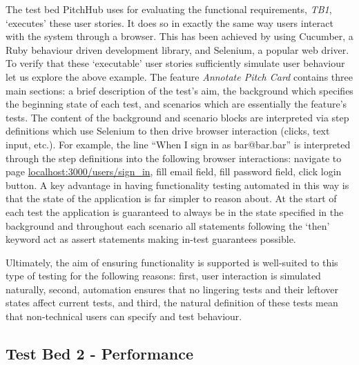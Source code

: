 The test bed PitchHub uses for evaluating the functional requirements, \textit{TB1}, `executes' these user stories. It does so in exactly the same way users interact with the system through a browser. This has been achieved by using Cucumber, a Ruby behaviour driven development library, and Selenium, a popular web driver. To verify that these `executable' user stories sufficiently simulate user behaviour let us explore the above example. The feature \textit{Annotate Pitch Card} contains three main sections: a brief description of the test's aim, the background which specifies the beginning state of each test, and scenarios which are essentially the feature's tests. The content of the background and scenario blocks are interpreted via step definitions which use Selenium to then drive browser interaction (clicks, text input, etc.). For example, the line ``When I sign in as bar@bar.bar'' is interpreted through the step definitions into the following browser interactions: navigate to page \url{localhost:3000/users/sign_in}, fill email field, fill password field, click login button.
A key advantage in having functionality testing automated in this way is that the state of the application is far simpler to reason about. At the start of each test the application is guaranteed to always be in the state specified in the background and throughout each scenario all statements following the `then' keyword act as assert statements making in-test guarantees possible.

Ultimately, the aim of ensuring functionality is supported is well-suited to this type of testing for the following reasons: first, user interaction is simulated naturally, second, automation ensures that no lingering tests and their leftover states affect current tests, and third, the natural definition of these tests mean that non-technical users can specify and test behaviour.

\subsection{Test Bed 2 - Performance}\label{SS:performance}

